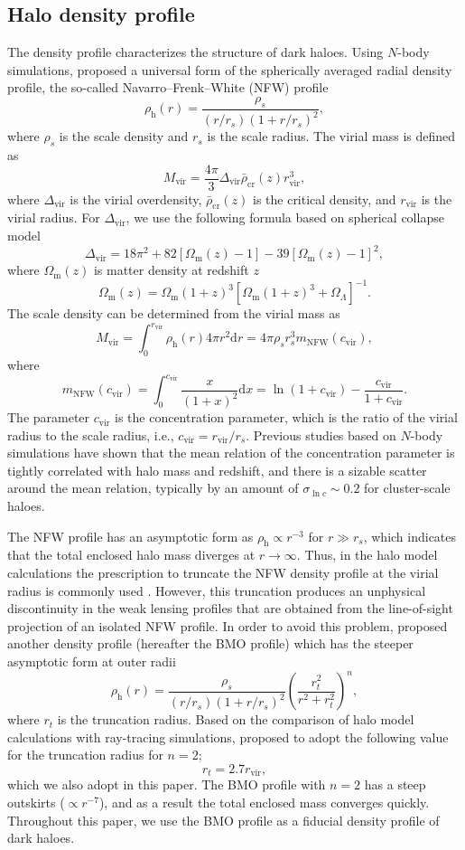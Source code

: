\documentclass[a4paper,fleqn,usenatbib]{mnras}
\newcommand{\beq}{\begin{equation}}
\newcommand{\eeq}{\end{equation}}
\newcommand{\vir}{\mathrm{vir}}
\begin{document}
\subsection{Halo density profile}
The density profile characterizes the structure of dark haloes.
Using $N$-body simulations, \citet{Navarro1996,Navarro1997} proposed a
universal form of the spherically averaged radial density profile, the
so-called Navarro--Frenk--White (NFW) profile
\beq
\rho_\mathrm{h}(r) = \frac{\rho_s}{(r/r_s)(1+r/r_s)^2},
\eeq
where $\rho_s$ is the scale density and $r_s$ is the scale radius.
The virial mass is defined as
\beq
M_\vir = \frac{4\pi}{3} \Delta_\vir \bar{\rho}_\mathrm{cr}(z) r_\vir^3,
\eeq
where $\Delta_\vir$ is the virial overdensity,
$\bar{\rho}_\mathrm{cr}(z)$ is the critical density, and
$r_\vir$ is the virial radius.
For $\Delta_\vir$, we use the following formula based on spherical
collapse model \citep{Bryan1998}
\beq
\Delta_\vir = 18 \pi^2 + 82 \left[\Omega_\mathrm{m} (z)-1\right] -
39 \left[\Omega_\mathrm{m} (z)-1\right]^2 ,
\eeq
where $\Omega_\mathrm{m} (z)$ is matter density at redshift $z$
\beq
\Omega_\mathrm{m} (z) = \Omega_\mathrm{m} (1+z)^3
[\Omega_\mathrm{m} (1+z)^3 + \Omega_\Lambda]^{-1} .
\eeq
The scale density can be determined from the virial mass as
\beq
M_\vir = \int_0^{r_\vir} \!\! \rho_\mathrm{h}(r) 4\pi r^2 \mathrm{d}r =
4 \pi \rho_s r_s^3 m_\mathrm{NFW} (c_\vir) ,
\eeq
where
\beq
m_\mathrm{NFW} (c_\vir) = \int_0^{c_\vir} \!\!
\frac{x}{(1+x)^2} \mathrm{d}x = \ln (1+c_\vir) -\frac{c_\vir}{1+c_\vir}.
\eeq
The parameter $c_\vir$ is the concentration parameter, which is the ratio of
the virial radius to the scale radius, i.e., $c_\vir = r_\vir/r_s$.
Previous studies \citep[e.g.,][]{Duffy2008,Diemer2015} based on
$N$-body simulations have shown that
the mean relation of the concentration parameter is tightly correlated
with halo mass and redshift,
and there is a sizable scatter around the mean relation,
typically by an amount of $\sigma_{\ln c} \sim 0.2$ for cluster-scale haloes.

The NFW profile has an asymptotic form as $\rho_\mathrm{h} \propto r^{-3}$ for
$r \gg r_s$, which indicates that the total enclosed halo mass diverges
at $r \rightarrow \infty$.
Thus, in the halo model calculations the prescription to truncate the
NFW density profile at the virial radius is commonly used
\citep{Takada2003a,Takada2003b}.
However, this truncation produces an unphysical discontinuity
in the weak lensing profiles that are obtained from the line-of-sight projection
of an isolated NFW profile.
In order to avoid this problem, \citet{Baltz2009} proposed
another density profile (hereafter the BMO profile) which has the
steeper asymptotic form at outer radii
\beq
\rho_\mathrm{h}(r) = \frac{\rho_s}{(r/r_s)(1+r/r_s)^2}
\left( \frac{r_t^2}{r^2+r_t^2} \right)^n ,
\eeq
where $r_t$ is the truncation radius. Based on the comparison of halo
model calculations with ray-tracing simulations,
\citet{Oguri2011} proposed to adopt the following value for the
truncation radius for $n=2$;
\beq
r_t = 2.7 r_\vir,
\eeq
which we also adopt in this paper.
The BMO profile with $n=2$ has a steep outskirts ($\propto r^{-7}$),
and as a result the total enclosed mass converges quickly.
Throughout this paper, we use the BMO profile as a fiducial density
profile of dark haloes.
\end{document}
